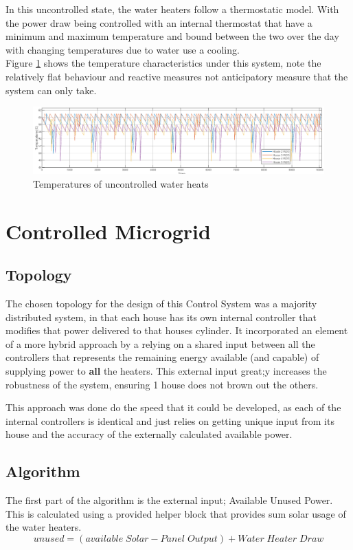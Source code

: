 \documentclass[11pt]{article}
\begin{document}
    In this uncontrolled state, the water heaters follow a thermostatic model. With the power draw being controlled with an internal thermostat that have a minimum and maximum temperature and bound between the two over the day with changing temperatures due to water use a cooling.\\
    Figure \ref{fig:unc_temps} shows the temperature characteristics under this system, note the relatively flat behaviour and reactive measures not anticipatory measure that the system can only take.

    \begin{figure}[h!]
        \centering
        \includegraphics[width=\textwidth]{inc/uncontrolled_temps.png}
        \caption{Temperatures of uncontrolled water heats}
        \label{fig:unc_temps}
    \end{figure}

    
    
\section{Controlled Microgrid}
    \subsection{Topology}
    The chosen topology for the design of this Control System was a majority distributed system, in that each house has its own internal controller that modifies that power delivered to that houses cylinder. It incorporated an element of a more hybrid approach by a relying on a shared input between all the controllers that represents the remaining energy available (and capable) of supplying power to \textbf{all} the heaters. This external input great;y increases the robustness of the system, ensuring 1 house does not brown out the others. 
    
    This approach was done do the speed that it could be developed, as each of the internal controllers is identical and just relies on getting unique input from its house and the accuracy of the externally calculated available power.
    \subsection{Algorithm}
    The first part of the algorithm is the external input; Available Unused Power. This is calculated using a provided helper block that provides sum solar usage of the water heaters.
    $$unused = (available\;Solar-Panel\;Output)+Water\;Heater\;Draw$$
\end{document}
